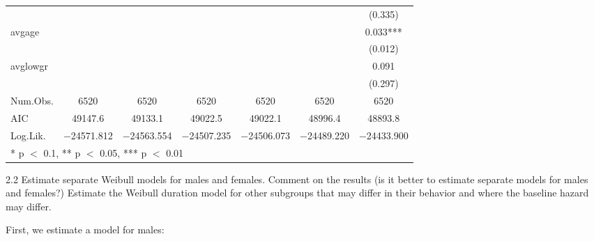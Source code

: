 \documentclass[
]{article}
\begin{document}
\begin{table}[!h]
{\begin{tabular}[t]{lcccccc}
 &  &  &  &  &  & (\num{0.335})\\
avgage &  &  &  &  &  & \num{0.033}***\\
 &  &  &  &  &  & (\num{0.012})\\
avglowgr &  &  &  &  &  & \num{0.091}\\
 &  &  &  &  &  & (\num{0.297})\\
\midrule
Num.Obs. & \num{6520} & \num{6520} & \num{6520} & \num{6520} & \num{6520} & \num{6520}\\
AIC & \num{49147.6} & \num{49133.1} & \num{49022.5} & \num{49022.1} & \num{48996.4} & \num{48893.8}\\
Log.Lik. & \num{-24571.812} & \num{-24563.554} & \num{-24507.235} & \num{-24506.073} & \num{-24489.220} & \num{-24433.900}\\
\bottomrule
\multicolumn{7}{l}{\rule{0pt}{1em}* p $<$ 0.1, ** p $<$ 0.05, *** p $<$ 0.01}\\
\end{tabular}}
\end{table}

\clearpage

2.2 Estimate separate Weibull models for males and females. Comment on
the results (is it better to estimate separate models for males and
females?) Estimate the Weibull duration model for other subgroups that
may differ in their behavior and where the baseline hazard may differ.

First, we estimate a model for males:
\end{document}
